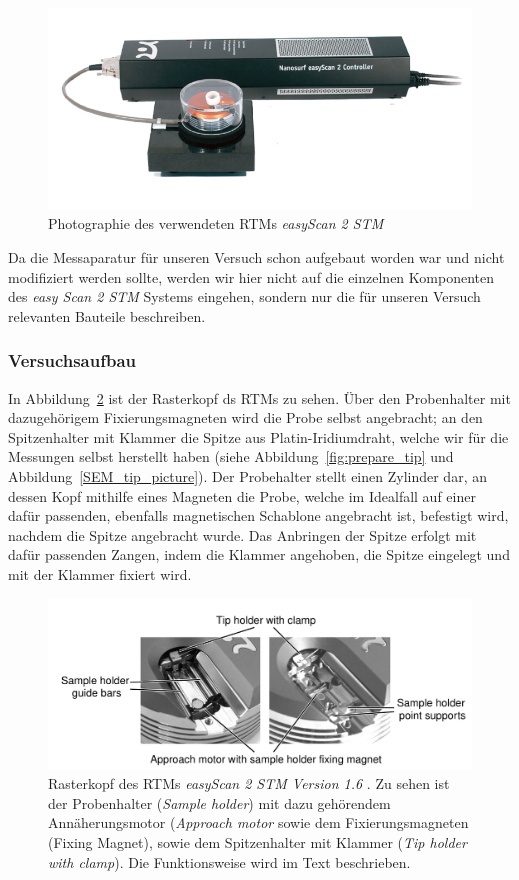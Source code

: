 \begin{figure}
\includegraphics[width=14cm]{pics/stm1}
\caption{Photographie des verwendeten RTMs \textit{easyScan 2
STM} \cite{easyscan2_STM}} 
 \label{fig:stm1}
\end{figure}

Da die Messaparatur für unseren Versuch schon aufgebaut worden
war und nicht modifiziert werden sollte, werden wir hier nicht
auf die einzelnen Komponenten des \textit{easy Scan 2 STM} Systems
eingehen, sondern nur die für unseren Versuch relevanten 
Bauteile beschreiben.
\subsubsection{Versuchsaufbau}
In Abbildung~\ref{fig:Rasterkopf} ist der Rasterkopf ds RTMs zu
sehen. Über den Probenhalter mit dazugehörigem Fixierungsmagneten
wird die Probe selbst angebracht; an den Spitzenhalter mit
Klammer die Spitze aus Platin-Iridiumdraht, 
welche wir für die Messungen selbst herstellt haben (siehe
Abbildung~\ref{fig:prepare_tip} und Abbildung~\ref{SEM_tip_picture}).
Der Probehalter stellt einen Zylinder dar, an dessen Kopf mithilfe
eines Magneten die Probe, welche im Idealfall auf einer dafür
passenden, ebenfalls magnetischen Schablone angebracht ist, 
befestigt wird, nachdem die Spitze angebracht wurde. 
Das Anbringen der Spitze erfolgt mit dafür passenden Zangen,
indem die Klammer angehoben, die Spitze eingelegt und mit
der Klammer fixiert wird.

\begin{figure}
\includegraphics[width=14cm]{pics/rasterkopf}
\caption{Rasterkopf des RTMs \textit{easyScan 2
STM Version 1.6} \cite{easyscan2_STM}.
Zu sehen ist der Probenhalter (\textit{Sample holder}) mit dazu
gehörendem Annäherungsmotor (\textit{Approach motor} sowie
dem Fixierungsmagneten ({Fixing Magnet}), sowie dem Spitzenhalter
mit Klammer (\textit{Tip holder with clamp}). Die Funktionsweise
wird im Text beschrieben.}
 \label{fig:Rasterkopf}
\end{figure}

